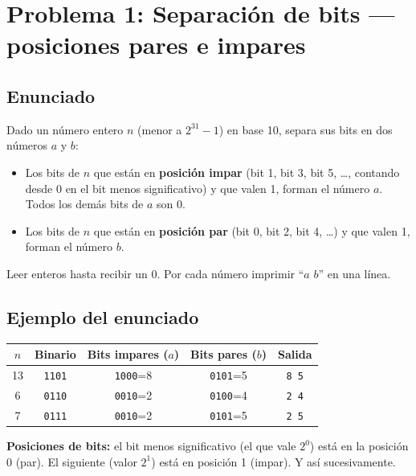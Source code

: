 \documentclass[12pt, oneside]{article}
\begin{document}
\section{Problema 1: Separación de bits — posiciones pares e impares}

\subsection{Enunciado}

Dado un número entero $n$ (menor a $2^{31}-1$) en base 10, separa sus bits en
dos números $a$ y $b$:

\begin{itemize}
  \item Los bits de $n$ que están en \textbf{posición impar} (bit 1, bit 3,
        bit 5, \ldots, contando desde 0 en el bit menos significativo) y que
        valen 1, forman el número $a$.  Todos los demás bits de $a$ son 0.
  \item Los bits de $n$ que están en \textbf{posición par} (bit 0, bit 2,
        bit 4, \ldots) y que valen 1, forman el número $b$.
\end{itemize}

Leer enteros hasta recibir un 0.  Por cada número imprimir ``$a$ $b$'' en una
línea.

\subsection{Ejemplo del enunciado}

\begin{center}
\begin{tabular}{ccccc}
  \toprule
  $n$ & \textbf{Binario} & \textbf{Bits impares} ($a$) & \textbf{Bits pares} ($b$) & \textbf{Salida} \\
  \midrule
  13 & \texttt{1101} & \texttt{1000}=8  & \texttt{0101}=5 & \texttt{8 5} \\
   6 & \texttt{0110} & \texttt{0010}=2  & \texttt{0100}=4 & \texttt{2 4} \\
   7 & \texttt{0111} & \texttt{0010}=2  & \texttt{0101}=5 & \texttt{2 5} \\
  \bottomrule
\end{tabular}
\end{center}

\begin{recuerda}
  \textbf{Posiciones de bits:} el bit menos significativo (el que vale $2^0$)
  está en la posición 0 (par).  El siguiente (valor $2^1$) está en posición 1
  (impar).  Y así sucesivamente.
\end{recuerda}
\end{document}
